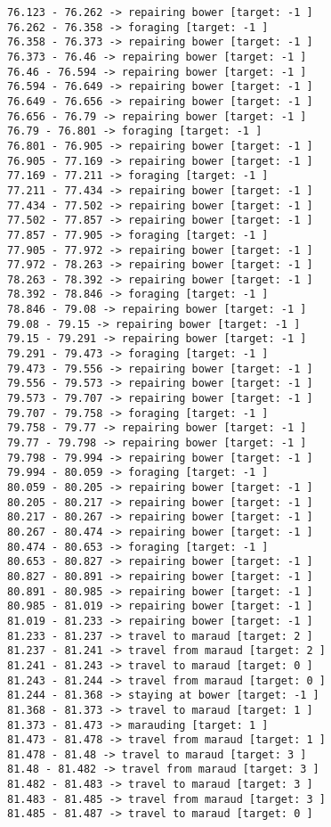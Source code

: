 \documentclass[11pt]{article}
\begin{document}
\begin{Verbatim}[commandchars=\\\{\}]
76.123 - 76.262 -> repairing bower [target: -1 ]
76.262 - 76.358 -> foraging [target: -1 ]
76.358 - 76.373 -> repairing bower [target: -1 ]
76.373 - 76.46 -> repairing bower [target: -1 ]
76.46 - 76.594 -> repairing bower [target: -1 ]
76.594 - 76.649 -> repairing bower [target: -1 ]
76.649 - 76.656 -> repairing bower [target: -1 ]
76.656 - 76.79 -> repairing bower [target: -1 ]
76.79 - 76.801 -> foraging [target: -1 ]
76.801 - 76.905 -> repairing bower [target: -1 ]
76.905 - 77.169 -> repairing bower [target: -1 ]
77.169 - 77.211 -> foraging [target: -1 ]
77.211 - 77.434 -> repairing bower [target: -1 ]
77.434 - 77.502 -> repairing bower [target: -1 ]
77.502 - 77.857 -> repairing bower [target: -1 ]
77.857 - 77.905 -> foraging [target: -1 ]
77.905 - 77.972 -> repairing bower [target: -1 ]
77.972 - 78.263 -> repairing bower [target: -1 ]
78.263 - 78.392 -> repairing bower [target: -1 ]
78.392 - 78.846 -> foraging [target: -1 ]
78.846 - 79.08 -> repairing bower [target: -1 ]
79.08 - 79.15 -> repairing bower [target: -1 ]
79.15 - 79.291 -> repairing bower [target: -1 ]
79.291 - 79.473 -> foraging [target: -1 ]
79.473 - 79.556 -> repairing bower [target: -1 ]
79.556 - 79.573 -> repairing bower [target: -1 ]
79.573 - 79.707 -> repairing bower [target: -1 ]
79.707 - 79.758 -> foraging [target: -1 ]
79.758 - 79.77 -> repairing bower [target: -1 ]
79.77 - 79.798 -> repairing bower [target: -1 ]
79.798 - 79.994 -> repairing bower [target: -1 ]
79.994 - 80.059 -> foraging [target: -1 ]
80.059 - 80.205 -> repairing bower [target: -1 ]
80.205 - 80.217 -> repairing bower [target: -1 ]
80.217 - 80.267 -> repairing bower [target: -1 ]
80.267 - 80.474 -> repairing bower [target: -1 ]
80.474 - 80.653 -> foraging [target: -1 ]
80.653 - 80.827 -> repairing bower [target: -1 ]
80.827 - 80.891 -> repairing bower [target: -1 ]
80.891 - 80.985 -> repairing bower [target: -1 ]
80.985 - 81.019 -> repairing bower [target: -1 ]
81.019 - 81.233 -> repairing bower [target: -1 ]
81.233 - 81.237 -> travel to maraud [target: 2 ]
81.237 - 81.241 -> travel from maraud [target: 2 ]
81.241 - 81.243 -> travel to maraud [target: 0 ]
81.243 - 81.244 -> travel from maraud [target: 0 ]
81.244 - 81.368 -> staying at bower [target: -1 ]
81.368 - 81.373 -> travel to maraud [target: 1 ]
81.373 - 81.473 -> marauding [target: 1 ]
81.473 - 81.478 -> travel from maraud [target: 1 ]
81.478 - 81.48 -> travel to maraud [target: 3 ]
81.48 - 81.482 -> travel from maraud [target: 3 ]
81.482 - 81.483 -> travel to maraud [target: 3 ]
81.483 - 81.485 -> travel from maraud [target: 3 ]
81.485 - 81.487 -> travel to maraud [target: 0 ]

\end{Verbatim}
\end{document}

